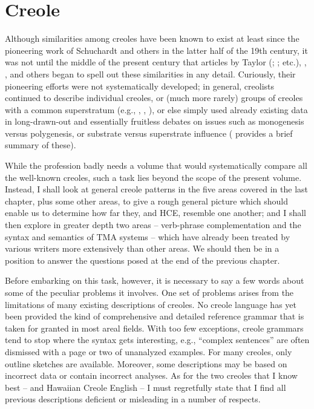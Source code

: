 \chapter{Creole} \label{ch:2}

Although similarities among creoles have been known to exist at least since the pioneering work of Schuchardt and others in the latter half of the 19th century, it was not until the middle of the present century that articles by Taylor (\citeyear{Taylor1960}; \citeyear{Taylor1963}; etc.), \citet{Thompson1961}, \citet{Whinnom1956, Whinnom1965}, and others began to spell out these similarities in any detail. Curiously, their pioneering efforts were not systematically developed; in general, creolists continued to describe individual creoles, or (much more rarely) groups of creoles with a common superstratum (e.g., \citealt{Goodman1964}, \citealt{Hancock1970}, \citealt{Alleyne1980}), or else simply used already existing data in long-drawn-out and essentially fruitless debates on issues such as monogenesis versus poly\-genesis, or substrate versus superstrate influence (\citealt{Bickerton1976} provides a brief summary of these).

While the profession badly needs a volume that would systematically compare all the well-known creoles, such a task lies beyond the scope of the present volume. Instead, I shall look at general creole patterns in the five areas covered in the last chapter, plus some other areas, to give a rough general picture which should enable us to deter\-mine how far they, and HCE, resemble one another; and I shall then
explore in greater depth two areas -- verb-phrase complementation and the syntax and semantics of TMA systems -- which have already been treated by various writers more extensively than other areas. We should then be in a position to answer the questions posed at the end of the previous chapter. 

Before embarking on this task, however, it is necessary to say a few words about some of the peculiar problems it involves. One set of problems arises from the limitations of many existing descriptions of creoles. No creole language has yet been provided the kind of com\-prehensive and detailed reference grammar that is taken for granted in most areal fields. With too few exceptions, creole grammars tend to stop where the syntax gets interesting, e.g., ``complex sentences'' are often dismissed with a page or two of unanalyzed examples. For many creoles, only outline sketches are available. Moreover, some descriptions may be based on incorrect data or contain incorrect analyses. As for the two creoles that I know best --  and Hawaiian Creole English -- I must regretfully state that I find all previous descriptions deficient\enlargethispage{1\baselineskip} or misleading in a number of respects.

